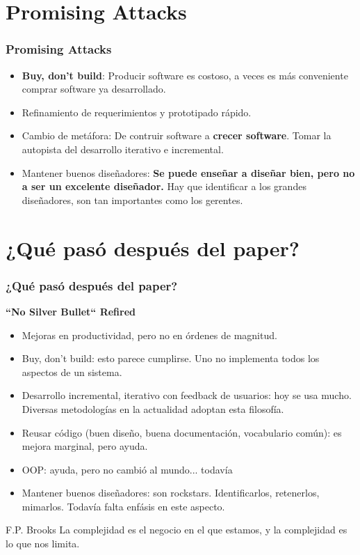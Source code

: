 \documentclass{beamer}
\begin{document}
\section{Promising Attacks}
\begin{frame}
  \frametitle{Promising Attacks}
  \begin{itemize}
    \item \textbf{Buy, don't build}: Producir software es costoso, a veces es más conveniente comprar software ya desarrollado.
    \item Refinamiento de requerimientos y prototipado rápido.
    \item Cambio de metáfora: De contruir software a \textbf{crecer software}. Tomar la autopista del desarrollo iterativo e incremental.
    \item Mantener buenos diseñadores: \textbf{Se puede enseñar a diseñar bien, pero no a ser un excelente diseñador.} Hay que identificar a los grandes diseñadores, son tan importantes como los gerentes.
  \end{itemize}
\end{frame}


\section{¿Qué pasó después del paper?}
\begin{frame}
  \frametitle{¿Qué pasó después del paper?}
  \textbf{``No Silver Bullet`` Refired}
  \begin{itemize}
    \item Mejoras en productividad, pero no en órdenes de magnitud.
    \item Buy, don't build: esto parece cumplirse. Uno no implementa todos los aspectos de un sistema.
    \item Desarrollo incremental, iterativo con feedback de usuarios: hoy se usa mucho. Diversas metodologías en la actualidad adoptan esta filosofía.
    \item Reusar código (buen diseño, buena documentación, vocabulario común): es mejora marginal, pero ayuda.
    \item OOP: ayuda, pero no cambió al mundo... todavía
    \item Mantener buenos diseñadores: son rockstars. Identificarlos, retenerlos, mimarlos. Todavía falta enfásis en este aspecto.
  \end{itemize}
  
  \begin{block}{F.P. Brooks}
La complejidad es el negocio en el que estamos, y la complejidad es lo que nos limita.
  \end{block}

\end{frame}
\end{document}
